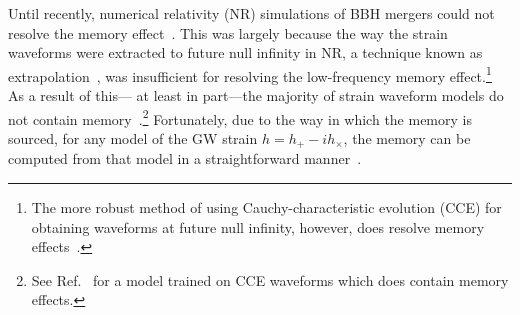 \documentclass[aps,prd,reprint,twocolumn,10pt,eqsecnum,showpacs,nofootinbib,amsfonts,amssymb,amsmath,longbibliography,superscriptaddress,floatfix]{revtex4-1}
\begin{document}
Until recently, numerical relativity (NR) simulations of BBH mergers could not resolve the memory effect~\cite{Favata:2010zu,Pollney:2010hs,Mitman:2020pbt}. This was largely because the way the strain waveforms were extracted to future null infinity in NR, a technique known as extrapolation~\cite{Boyle:2019kee}, was insufficient for resolving the low-frequency memory effect.\footnote{The more robust method of using Cauchy-characteristic evolution (CCE) for obtaining waveforms at future null infinity, however, does resolve memory effects~\cite{Bishop:1996gt,Bishop:1997ik,Bishop:1998uk,Reisswig:2009rx,Reisswig:2009us,Babiuc:2010ze,Pollney:2010hs,Handmer:2014qha,Handmer:2015dsa,Handmer:2016mls,Moxon:2020gha,Moxon:2021gbv,Mitman:2020pbt}.} As a result of this--- at least in part---the majority of strain waveform models do not contain memory~\cite{Taracchini:2013rva,Pan:2013rra,Hannam:2013oca,Bohe:2016gbl,Ossokine:2020kjp,Varma:2019csw,Pratten:2020ceb,Colleoni:2024knd,Pompili:2023tna,Ramos-Buades:2023ehm,Hamilton:2021pkf,Thompson:2023ase}.\footnote{See Ref.~\cite{Yoo:2023spi} for a model trained on CCE waveforms which does contain memory effects.} Fortunately, due to the way in which the memory is sourced, for any model of the GW strain $h=h_{+}-ih_{\times}$, the memory can be computed from that model in a straightforward manner~\cite{Talbot:2018sgr,Mitman:2020pbt,Mitman:2020bjf}.
\end{document}
